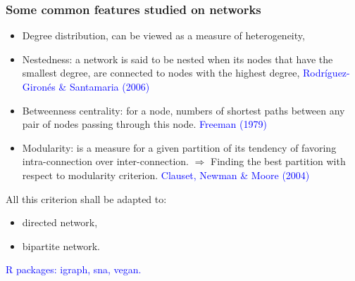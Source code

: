 \documentclass[nopagenumber,9pt]{beamer}
\begin{document}
\begin{frame}
\frametitle{Some common features studied on networks}


\begin{itemize}

\item Degree distribution, can be viewed as a measure of heterogeneity,
\item Nestedness: a network is said to be nested when its nodes that have the smallest degree, are connected to nodes with the highest degree,
\textcolor{blue}{Rodríguez-Gironés \& Santamaria (2006)}

\item Betweenness centrality: for a node, numbers of shortest paths between any pair of nodes passing through this node.
\textcolor{blue}{Freeman (1979)}

\item Modularity: is a measure for a given partition of its tendency of favoring intra-connection over inter-connection.  
$\Rightarrow$ Finding the best partition with respect to modularity criterion. 
\textcolor{blue}{Clauset, Newman \& Moore (2004)}
\end{itemize}


\bigskip

All this criterion shall be adapted to:
\begin{itemize}
 \item directed network,
 \item bipartite network.
\end{itemize}

\bigskip

\textcolor{blue}{R packages: igraph, sna, vegan.} 


\end{frame}
\end{document}
